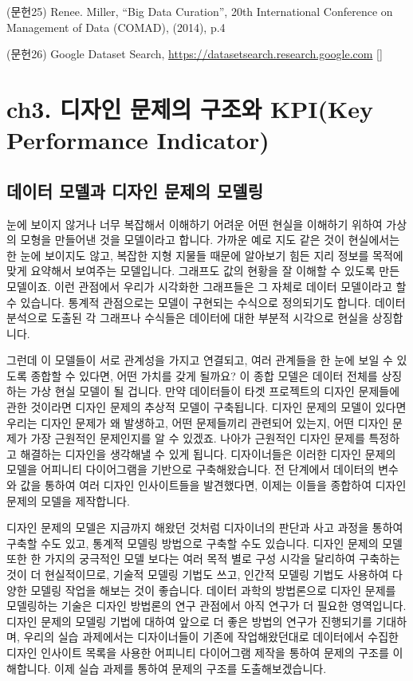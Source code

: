 \documentclass[
  letterpaper,
]{book}
\begin{document}
(문헌25) Renee. Miller, ``Big Data Curation'', 20th International
Conference on Management of Data (COMAD), (2014), p.4

(문헌26) Google Dataset Search,
\url{https://datasetsearch.research.google.com} {[}{]}

\chapter{ch3. 디자인 문제의 구조와 KPI(Key Performance
Indicator)}\label{ch3.-uxb514uxc790uxc778-uxbb38uxc81cuxc758-uxad6cuxc870uxc640-kpikey-performance-indicator}

\section{데이터 모델과 디자인 문제의
모델링}\label{uxb370uxc774uxd130-uxbaa8uxb378uxacfc-uxb514uxc790uxc778-uxbb38uxc81cuxc758-uxbaa8uxb378uxb9c1}

눈에 보이지 않거나 너무 복잡해서 이해하기 어려운 어떤 현실을 이해하기
위하여 가상의 모형을 만들어낸 것을 모델이라고 합니다. 가까운 예로 지도
같은 것이 현실에서는 한 눈에 보이지도 않고, 복잡한 지형 지물들 때문에
알아보기 힘든 지리 정보를 목적에 맞게 요약해서 보여주는 모델입니다.
그래프도 값의 현황을 잘 이해할 수 있도록 만든 모델이죠. 이런 관점에서
우리가 시각화한 그래프들은 그 자체로 데이터 모델이라고 할 수 있습니다.
통계적 관점으로는 모델이 구현되는 수식으로 정의되기도 합니다. 데이터
분석으로 도출된 각 그래프나 수식들은 데이터에 대한 부분적 시각으로
현실을 상징합니다.

그런데 이 모델들이 서로 관계성을 가지고 연결되고, 여러 관계들을 한 눈에
보일 수 있도록 종합할 수 있다면, 어떤 가치를 갖게 될까요? 이 종합 모델은
데이터 전체를 상징하는 가상 현실 모델이 될 겁니다. 만약 데이터들이 타겟
프로젝트의 디자인 문제들에 관한 것이라면 디자인 문제의 추상적 모델이
구축됩니다. 디자인 문제의 모델이 있다면 우리는 디자인 문제가 왜
발생하고, 어떤 문제들끼리 관련되어 있는지, 어떤 디자인 문제가 가장
근원적인 문제인지를 알 수 있겠죠. 나아가 근원적인 디자인 문제를 특정하고
해결하는 디자인을 생각해낼 수 있게 됩니다. 디자이너들은 이러한 디자인
문제의 모델을 어피니티 다이어그램을 기반으로 구축해왔습니다. 전 단계에서
데이터의 변수와 값을 통하여 여러 디자인 인사이트들을 발견했다면, 이제는
이들을 종합하여 디자인 문제의 모델을 제작합니다.

디자인 문제의 모델은 지금까지 해왔던 것처럼 디자이너의 판단과 사고
과정을 통하여 구축할 수도 있고, 통계적 모델링 방법으로 구축할 수도
있습니다. 디자인 문제의 모델 또한 한 가지의 궁극적인 모델 보다는 여러
목적 별로 구성 시각을 달리하여 구축하는 것이 더 현실적이므로, 기술적
모델링 기법도 쓰고, 인간적 모델링 기법도 사용하여 다양한 모델링 작업을
해보는 것이 좋습니다. 데이터 과학의 방법론으로 디자인 문제를 모델링하는
기술은 디자인 방법론의 연구 관점에서 아직 연구가 더 필요한 영역입니다.
디자인 문제의 모델링 기법에 대하여 앞으로 더 좋은 방법의 연구가
진행되기를 기대하며, 우리의 실습 과제에서는 디자이너들이 기존에
작업해왔던대로 데이터에서 수집한 디자인 인사이트 목록을 사용한 어피니티
다이어그램 제작을 통하여 문제의 구조를 이해합니다. 이제 실습 과제를
통하여 문제의 구조를 도출해보겠습니다.
\end{document}
